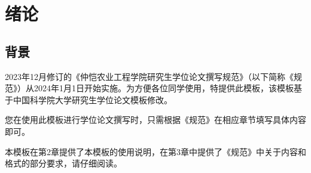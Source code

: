 \chapter{绪论}\label{chap:introduction}

\section{背景}

2023年12月修订的《仲恺农业工程学院研究生学位论文撰写规范》（以下简称《规范》）从2024年1月1日开始实施。为方便各位同学使用，特提供此模板，该模板基于中国科学院大学研究生学位论文模板修改。

您在使用此模板进行学位论文撰写时，只需根据《规范》在相应章节填写具体内容即可。

本模板在第2章提供了本模板的使用说明，在第3章中提供了《规范》中关于内容和格式的部分要求，请仔细阅读。


